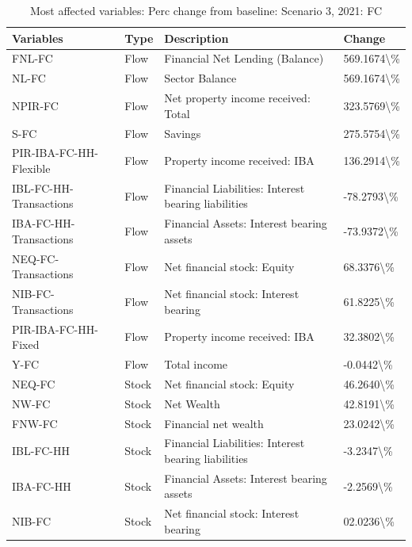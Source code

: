 \documentclass[
]{book}
\begin{document}
\begin{table}

\caption{\label{tab:most-affected-Scenario-3-perc-FC}Most affected variables: Perc change from baseline: Scenario 3, 2021: FC}
\centering
\fontsize{10}{12}\selectfont
\begin{tabular}[t]{l|l|l|l}
\hline
Variables & Type & Description & Change\\
\hline
FNL-FC & Flow & Financial Net Lending (Balance) & 569.1674\textbackslash{}\%\\
\hline
NL-FC & Flow & Sector Balance & 569.1674\textbackslash{}\%\\
\hline
NPIR-FC & Flow & Net property income received: Total & 323.5769\textbackslash{}\%\\
\hline
S-FC & Flow & Savings & 275.5754\textbackslash{}\%\\
\hline
PIR-IBA-FC-HH-Flexible & Flow & Property income received: IBA & 136.2914\textbackslash{}\%\\
\hline
IBL-FC-HH-Transactions & Flow & Financial Liabilities: Interest bearing liabilities & -78.2793\textbackslash{}\%\\
\hline
IBA-FC-HH-Transactions & Flow & Financial Assets: Interest bearing assets & -73.9372\textbackslash{}\%\\
\hline
NEQ-FC-Transactions & Flow & Net financial stock: Equity & 68.3376\textbackslash{}\%\\
\hline
NIB-FC-Transactions & Flow & Net financial stock: Interest bearing & 61.8225\textbackslash{}\%\\
\hline
PIR-IBA-FC-HH-Fixed & Flow & Property income received: IBA & 32.3802\textbackslash{}\%\\
\hline
Y-FC & Flow & Total income & -0.0442\textbackslash{}\%\\
\hline
NEQ-FC & Stock & Net financial stock: Equity & 46.2640\textbackslash{}\%\\
\hline
NW-FC & Stock & Net Wealth & 42.8191\textbackslash{}\%\\
\hline
FNW-FC & Stock & Financial net wealth & 23.0242\textbackslash{}\%\\
\hline
IBL-FC-HH & Stock & Financial Liabilities: Interest bearing liabilities & -3.2347\textbackslash{}\%\\
\hline
IBA-FC-HH & Stock & Financial Assets: Interest bearing assets & -2.2569\textbackslash{}\%\\
\hline
NIB-FC & Stock & Net financial stock: Interest bearing & 02.0236\textbackslash{}\%\\
\hline
\end{tabular}
\end{table}
\end{document}
